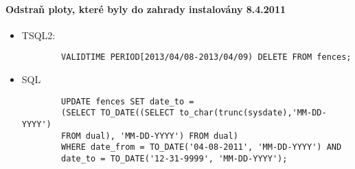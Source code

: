 \documentclass[12pt,a4paper]{article}
\begin{document}
\paragraph*{Odstraň ploty, které byly do zahrady instalovány 8.4.2011}
\begin{itemize}

    \item
    TSQL2:
        \begin{verbatim}
        VALIDTIME PERIOD[2013/04/08-2013/04/09) DELETE FROM fences;
        \end{verbatim}
    \newpage
    \item
    SQL
        \begin{verbatim}
        UPDATE fences SET date_to =
        (SELECT TO_DATE((SELECT to_char(trunc(sysdate),'MM-DD-YYYY')
        FROM dual), 'MM-DD-YYYY') FROM dual)
        WHERE date_from = TO_DATE('04-08-2011', 'MM-DD-YYYY') AND
        date_to = TO_DATE('12-31-9999', 'MM-DD-YYYY');
        \end{verbatim}

\end{itemize}
\end{document}
